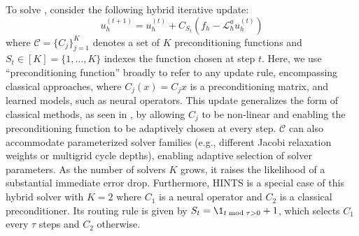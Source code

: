 \documentclass{article} %
\begin{document}
To solve , consider the following hybrid iterative update:
\begin{equation}
     u^{\left(t + 1\right)}_h = u^{\left(t\right)}_h + C_{S_t}\left(f_h - \mathcal{L}_h^au^{\left(t \right)}_h\right)
\end{equation}
where $\mathcal{C} =\{C_{j}\}_{j = 1}^K$ denotes a set of $K$ preconditioning functions and $S_t \in [K] = \{1, \dots, K\}$ indexes the function chosen at step $t$. Here, we use ``preconditioning function'' broadly to refer to any update rule, encompassing classical approaches, where $C_j(x) = C_jx$ is a preconditioning matrix, and learned models, such as neural operators. 
This update generalizes the form of classical methods, as seen in , by allowing $C_j$ to be non-linear and enabling the preconditioning function to be adaptively chosen at every step. $\mathcal{C}$ can also accommodate parameterized solver families (e.g., different Jacobi relaxation weights or multigrid cycle depths), enabling adaptive selection of solver parameters.  As the number of solvers $K$ grows, it raises the likelihood of a substantial immediate error drop. Furthermore, HINTS \citep{zhang2024blending} is a special case of this hybrid solver with $K = 2$ where  $C_1$ is a neural operator and $C_2$ is a classical preconditioner. Its routing rule is given by $S_t = \1_{t \bmod \tau > 0} + 1$, which selects $C_1$ every $\tau$ steps and $C_2$ otherwise.
\end{document}
